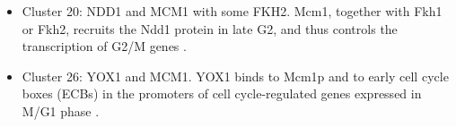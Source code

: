 \documentclass[]{article}
\begin{document}
\begin{itemize}
	\item Cluster 20: NDD1 and MCM1 with some FKH2. Mcm1, together with Fkh1 or Fkh2, recruits the Ndd1 protein in late G2, and thus controls the transcription of G2/M genes \citep{simon2001serial, koranda2000forkhead}. 
	\item Cluster 26: YOX1 and MCM1. YOX1 binds to Mcm1p and to early cell cycle boxes (ECBs) in the promoters of cell cycle-regulated genes expressed in M/G1 phase \citep{pramila2002conserved}. 
\end{itemize}

\end{document}
